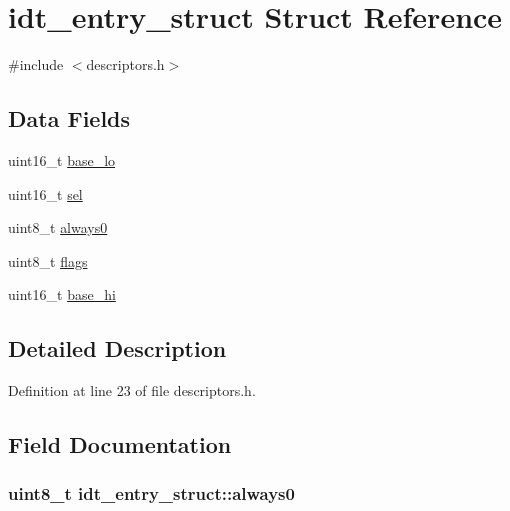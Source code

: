 \hypertarget{structidt__entry__struct}{}\section{idt\+\_\+entry\+\_\+struct Struct Reference}
\label{structidt__entry__struct}


{\ttfamily \#include $<$descriptors.\+h$>$}

\subsection*{Data Fields}
\begin{DoxyCompactItemize}
\item 
uint16\+\_\+t \hyperlink{structidt__entry__struct_a4b5fce0881deb4959d33da77d1ed0202}{base\+\_\+lo}
\item 
uint16\+\_\+t \hyperlink{structidt__entry__struct_a3c9321c263139e56901a05efee220047}{sel}
\item 
uint8\+\_\+t \hyperlink{structidt__entry__struct_adc747b3ff87142c71b7b8c51e03c067c}{always0}
\item 
uint8\+\_\+t \hyperlink{structidt__entry__struct_a02277c77564820972ae5df0a37c80be0}{flags}
\item 
uint16\+\_\+t \hyperlink{structidt__entry__struct_af46adb2603d1d8b4a3bedf7f1c6daed4}{base\+\_\+hi}
\end{DoxyCompactItemize}


\subsection{Detailed Description}


Definition at line 23 of file descriptors.\+h.



\subsection{Field Documentation}
\subsubsection[{\texorpdfstring{always0}{always0}}]{\setlength{\rightskip}{0pt plus 5cm}uint8\+\_\+t idt\+\_\+entry\+\_\+struct\+::always0}\hypertarget{structidt__entry__struct_adc747b3ff87142c71b7b8c51e03c067c}{}\label{structidt__entry__struct_adc747b3ff87142c71b7b8c51e03c067c}


